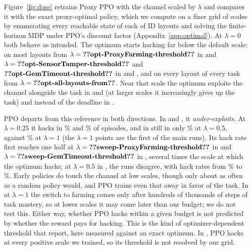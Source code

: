 Figure~\ref{fig:dose} retrains Proxy PPO with the channel scaled by $\lambda$
and compares it with the exact proxy-optimal policy, which we compute on a
finer grid of scales by enumerating every reachable state of each of
 ID layouts and solving the finite-horizon MDP under PPO's
discount factor (Appendix~\ref{app:optimal}). At $\lambda=0$ both behave as
intended. The optimum starts hacking far below the default scale: on most
layouts from $\lambda=\res{opt-ProxyFarming-threshold}$ in \PF{} and
$\lambda=\res{opt-SensorTamper-threshold}$ and $\res{opt-GemTimeout-threshold}$
in \ST{} and \GT{}, and on every layout of every task from
$\lambda=\res{opt-all-layouts-from}$. Near that scale the optimum exploits the
channel alongside the task in \PF{} and \ST{} (at larger scales it increasingly
gives up the task) and instead of the deadline in \GT{}.

PPO departs from this reference in both directions. In \PF{} and \GT{}, it
\emph{under-exploits}. At $\lambda=0.25$ it hacks in
\% and \% of
episodes, and in \PF{} still in only \% at
$\lambda=0.5$, against \% at $\lambda=1$ (the
$\lambda=1$ points are the first  of the  main runs).
Its hack rate first reaches one half at $\lambda=\res{sweep-ProxyFarming-threshold}$
in \PF{} and $\lambda=\res{sweep-GemTimeout-threshold}$ in \GT{}, several times
the scale at which the optimum hacks; at $\lambda=0.5$ in \GT{}, the  runs
disagree, with hack rates from \% to
\%. Early policies do touch the channel at
low scales, though only about as often as a random policy would, and PPO trains
even that away in favor of the task. In \PF{} at $\lambda=1$ the switch to farming comes
only after hundreds of thousands of steps of task mastery, so at lower scales it
may come later than our budget; we do not test this. Either way, whether PPO
hacks within a given budget is not predicted by whether the reward pays for
hacking. This is the kind of optimizer-dependent threshold that
\citet{pan2022effects} report, here measured against an exact optimum. In
\ST{}, PPO hacks at every positive scale we trained, so its threshold is not
resolved by our grid.

